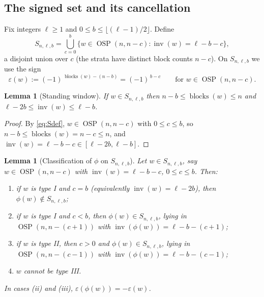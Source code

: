 \documentclass[11pt]{amsart}
\newtheorem{lemma}[theorem]{Lemma}
\theoremstyle{definition}
\DeclareMathOperator{\OSP}{OSP}
\DeclareMathOperator{\inv}{inv}
\DeclareMathOperator{\blocks}{blocks}
\begin{document}
\subsection{The signed set and its cancellation}
Fix integers $\ell\ge1$ and $0\le b\le\lfloor(\ell-1)/2\rfloor$. Define
\begin{equation}\label{eq:Sdef}
S_{n,\ell,b}=\bigcup_{c=0}^b \{w\in\OSP(n,n-c):\inv(w)=\ell-b-c\},
\end{equation}
a disjoint union over $c$ (the strata have distinct block counts $n-c$). On
$S_{n,\ell,b}$ we use the sign
\begin{equation}\label{eq:epsdef}
\varepsilon(w):=(-1)^{\,\blocks(w)-(n-b)}=(-1)^{\,b-c}\qquad
\text{for }w\in\OSP(n,n-c).
\end{equation}

\begin{lemma}[Standing window]\label{lem:window}
If $w\in S_{n,\ell,b}$ then $n-b\le\blocks(w)\le n$ and
$\ell-2b\le\inv(w)\le\ell-b$.
\end{lemma}

\begin{proof}
By \eqref{eq:Sdef}, $w\in\OSP(n,n-c)$ with $0\le c\le b$, so
$n-b\le\blocks(w)=n-c\le n$, and $\inv(w)=\ell-b-c\in[\ell-2b,\ell-b]$.
\end{proof}

\begin{lemma}[Classification of $\phi$ on $S_{n,\ell,b}$]\label{lem:classify}
Let $w\in S_{n,\ell,b}$, say $w\in\OSP(n,n-c)$ with $\inv(w)=\ell-b-c$,
$0\le c\le b$. Then:
\begin{enumerate}[\rm(i)]
\item if $w$ is type I and $c=b$ (equivalently $\inv(w)=\ell-2b$), then
$\phi(w)\notin S_{n,\ell,b}$;
\item if $w$ is type I and $c<b$, then $\phi(w)\in S_{n,\ell,b}$, lying in
$\OSP(n,n-(c+1))$ with $\inv(\phi(w))=\ell-b-(c+1)$;
\item if $w$ is type II, then $c>0$ and $\phi(w)\in S_{n,\ell,b}$, lying in
$\OSP(n,n-(c-1))$ with $\inv(\phi(w))=\ell-b-(c-1)$;
\item $w$ cannot be type III.
\end{enumerate}
In cases (ii) and (iii), $\varepsilon(\phi(w))=-\varepsilon(w)$.
\end{lemma}
\end{document}
